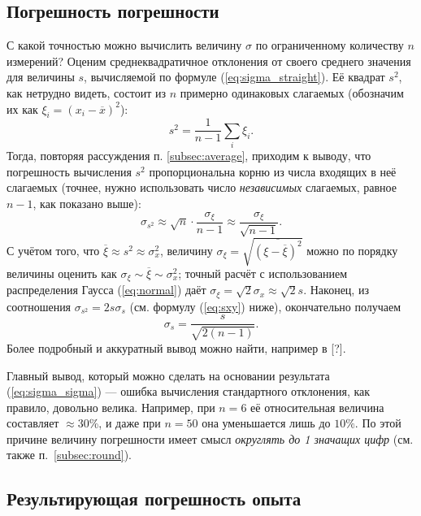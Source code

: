 \documentclass[10pt]{article}
\begin{document}
\subsection{Погрешность погрешности}

С какой точностью можно вычислить величину $\sigma$ по ограниченному
количеству $n$ измерений? Оценим среднеквадратичное отклонения от
своего среднего значения для величины $s$, вычисляемой по формуле
(\ref{eq:sigma_straight}). Её квадрат $s^{2}$, как нетрудно видеть,
состоит из $n$ примерно одинаковых слагаемых (обозначим их как $\xi_{i}=\left(x_{i}-\overline{x}\right)^{2}$):
\[
s^{2}=\frac{1}{n-1}\sum_{i}\xi_{i}.
\]
Тогда, повторяя рассуждения п. \ref{subsec:average}, приходим к выводу,
что погрешность вычисления $s^{2}$ пропорциональна корню из числа
входящих в неё слагаемых (точнее, нужно использовать число \emph{независимых}
слагаемых, равное $n-1$, как показано выше):
\[
\sigma_{s^{2}}\approx\sqrt{n}\cdot\frac{\sigma_{\xi}}{n-1}\approx\frac{\sigma_{\xi}}{\sqrt{n-1}}.
\]
С учётом того, что $\overline{\xi}\approx s^{2}\approx\sigma_{x}^{2}$,
величину $\sigma_{\xi}=\sqrt{\overline{\left(\xi-\overline{\xi}\right)^{2}}}$
можно по порядку величины оценить как $\sigma_{\xi}\sim\overline{\xi}\sim\sigma_{x}^{2}$;
точный расчёт с использованием распределения Гаусса (\ref{eq:normal})
даёт $\sigma_{\xi}=\sqrt{2}\sigma_{x}\approx\sqrt{2}s.$ Наконец,
из соотношения $\sigma_{s^{2}}=2s\sigma_{s}$ (см. формулу (\ref{eq:sxy})
ниже), окончательно получаем
\begin{equation}
\sigma_{s}=\frac{s}{\sqrt{2\left(n-1\right)}}.\label{eq:sigma_sigma}
\end{equation}
Более подробный и аккуратный вывод можно найти, например в {[}?{]}.

Главный вывод, который можно сделать на основании результата (\ref{eq:sigma_sigma})
--- ошибка вычисления стандартного отклонения, как правило,
довольно велика. Например, при $n=6$ её относительная величина составляет
$\approx$30\%, и даже при $n=50$ она уменьшается лишь до $10\%$.
По этой причине величину погрешности имеет смысл \emph{округлять до
1 значащих цифр} (см. также п.~\ref{subsec:round}).

\subsection{Результирующая погрешность опыта}
\end{document}
